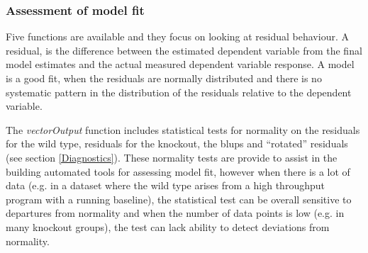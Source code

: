 \documentclass[12pt,a4paper]{article}
\begin{document}
\subsubsection{Assessment of model fit}

Five functions are available and they focus on looking at residual behaviour. 
A residual, is the difference between the estimated dependent variable from the final model estimates and the actual measured dependent variable response. 
A model is a good fit, when the residuals are normally distributed and there is no systematic pattern in the distribution of the residuals relative to the dependent variable. 

The \textit{vectorOutput} function includes statistical tests for normality on the residuals for the wild type, residuals for the knockout, the blups and ``rotated'' residuals (see section \ref{Diagnostics}). 
These normality tests are provide to assist in the building automated tools for assessing model fit, 
however when there is a lot of data (e.g. in a dataset where the wild type arises from a high throughput program with a running baseline), 
the statistical test can be overall sensitive to departures from normality and when the number of data points is low (e.g. in many knockout groups), the test can lack ability to detect deviations from normality. 
\end{document}
